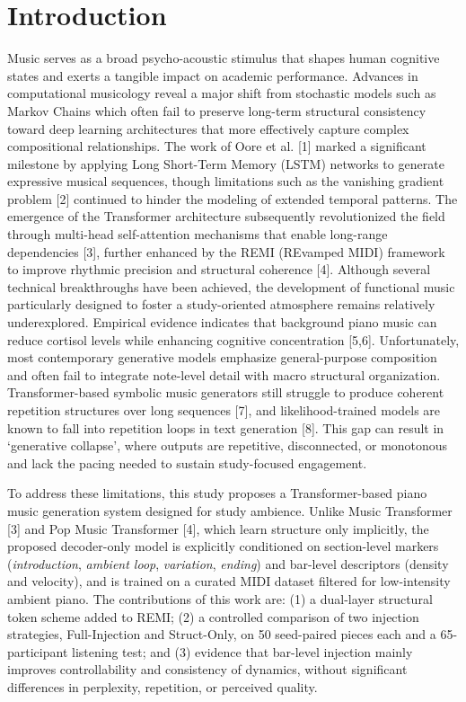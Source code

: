 \documentclass[conference,a4paper]{IEEEtran}
\begin{document}
\section{Introduction}
Music serves as a broad psycho-acoustic stimulus that shapes human cognitive states and exerts a tangible impact on academic performance. Advances in computational musicology reveal a major shift from stochastic models such as Markov Chains which often fail to preserve long-term structural consistency toward deep learning architectures that more effectively capture complex compositional relationships. The work of Oore et al. [1] marked a significant milestone by applying Long Short-Term Memory (LSTM) networks to generate expressive musical sequences, though limitations such as the vanishing gradient problem [2] continued to hinder the modeling of extended temporal patterns. The emergence of the Transformer architecture subsequently revolutionized the field through multi-head self-attention mechanisms that enable long-range dependencies [3], further enhanced by the REMI (REvamped MIDI) framework to improve rhythmic precision and structural coherence [4]. Although several technical breakthroughs have been achieved, the development of functional music particularly designed to foster a study-oriented atmosphere remains relatively underexplored. Empirical evidence indicates that background piano music can reduce cortisol levels while enhancing cognitive concentration [5,6]. Unfortunately, most contemporary generative models emphasize general-purpose composition and often fail to integrate note-level detail with macro structural organization. Transformer-based symbolic music generators still struggle to produce coherent repetition structures over long sequences [7], and likelihood-trained models are known to fall into repetition loops in text generation [8]. This gap can result in `generative collapse', where outputs are repetitive, disconnected, or monotonous and lack the pacing needed to sustain study-focused engagement.

To address these limitations, this study proposes a Transformer-based piano music generation system designed for study ambience. Unlike Music Transformer [3] and Pop Music Transformer [4], which learn structure only implicitly, the proposed decoder-only model is explicitly conditioned on section-level markers (\textit{introduction}, \textit{ambient loop}, \textit{variation}, \textit{ending}) and bar-level descriptors (density and velocity), and is trained on a curated MIDI dataset filtered for low-intensity ambient piano. The contributions of this work are: (1) a dual-layer structural token scheme added to REMI; (2) a controlled comparison of two injection strategies, Full-Injection and Struct-Only, on 50 seed-paired pieces each and a 65-participant listening test; and (3) evidence that bar-level injection mainly improves controllability and consistency of dynamics, without significant differences in perplexity, repetition, or perceived quality.
\end{document}
